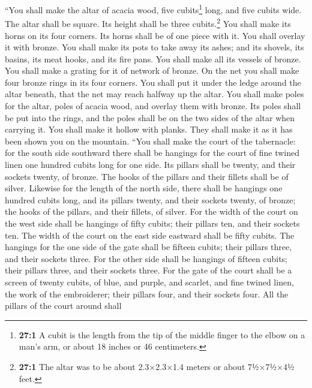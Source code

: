  ``You shall make the altar of acacia wood, five
cubits\footnote{\textbf{27:1} A cubit is the length from the tip of the
  middle finger to the elbow on a man's arm, or about 18 inches or 46
  centimeters.} long, and five cubits wide. The altar shall be square.
Its height shall be three cubits.\footnote{\textbf{27:1} The altar was
  to be about 2.3×2.3×1.4 meters or about 7½×7½×4½ feet.} 
You shall make its horns on its four corners. Its horns shall be of one
piece with it. You shall overlay it with bronze.  You
shall make its pots to take away its ashes; and its shovels, its basins,
its meat hooks, and its fire pans. You shall make all its vessels of
bronze.  You shall make a grating for it of network of
bronze. On the net you shall make four bronze rings in its four corners.
 You shall put it under the ledge around the altar
beneath, that the net may reach halfway up the altar.  You
shall make poles for the altar, poles of acacia wood, and overlay them
with bronze.  Its poles shall be put into the rings, and
the poles shall be on the two sides of the altar when carrying it.
 You shall make it hollow with planks. They shall make it
as it has been shown you on the mountain.  ``You shall
make the court of the tabernacle: for the south side southward there
shall be hangings for the court of fine twined linen one hundred cubits
long for one side.  Its pillars shall be twenty, and
their sockets twenty, of bronze. The hooks of the pillars and their
fillets shall be of silver.  Likewise for the length of
the north side, there shall be hangings one hundred cubits long, and its
pillars twenty, and their sockets twenty, of bronze; the hooks of the
pillars, and their fillets, of silver.  For the width of
the court on the west side shall be hangings of fifty cubits; their
pillars ten, and their sockets ten.  The width of the
court on the east side eastward shall be fifty cubits. 
The hangings for the one side of the gate shall be fifteen cubits; their
pillars three, and their sockets three.  For the other
side shall be hangings of fifteen cubits; their pillars three, and their
sockets three.  For the gate of the court shall be a
screen of twenty cubits, of blue, and purple, and scarlet, and fine
twined linen, the work of the embroiderer; their pillars four, and their
sockets four.  All the pillars of the court around shall
